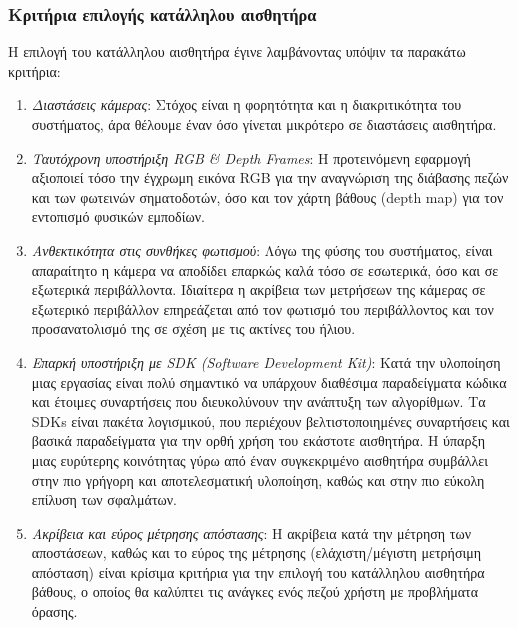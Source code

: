 \subsubsection{Κριτήρια επιλογής κατάλληλου αισθητήρα}
Η επιλογή του κατάλληλου αισθητήρα έγινε λαμβάνοντας υπόψιν τα παρακάτω κριτήρια:
\begin{enumerate}
    \item \emph{Διαστάσεις κάμερας}: Στόχος είναι η φορητότητα και η διακριτικότητα του συστήματος, άρα θέλουμε έναν όσο γίνεται μικρότερο σε διαστάσεις αισθητήρα.
    \item \emph{Ταυτόχρονη υποστήριξη RGB \& Depth Frames}: Η προτεινόμενη εφαρμογή αξιοποιεί τόσο την έγχρωμη εικόνα RGB για την αναγνώριση της διάβασης πεζών και των φωτεινών σηματοδοτών, όσο και τον χάρτη βάθους (depth map) για τον εντοπισμό φυσικών εμποδίων.
    \item \emph{Ανθεκτικότητα στις συνθήκες φωτισμού}: Λόγω της φύσης του συστήματος, είναι απαραίτητο η κάμερα να αποδίδει επαρκώς καλά τόσο σε εσωτερικά, όσο και σε εξωτερικά περιβάλλοντα. Ιδιαίτερα η ακρίβεια των μετρήσεων της κάμερας σε εξωτερικό περιβάλλον επηρεάζεται από τον φωτισμό του περιβάλλοντος και τον προσανατολισμό της σε σχέση με τις ακτίνες του ήλιου. 
    \item \emph{Επαρκή υποστήριξη με SDK (Software Development Kit)}: Κατά την υλοποίηση μιας εργασίας είναι πολύ σημαντικό να υπάρχουν διαθέσιμα παραδείγματα κώδικα και έτοιμες συναρτήσεις που διευκολύνουν την ανάπτυξη των αλγορίθμων. Τα SDKs είναι πακέτα λογισμικού, που περιέχουν βελτιστοποιημένες συναρτήσεις και βασικά παραδείγματα για την ορθή χρήση του εκάστοτε αισθητήρα. Η ύπαρξη μιας ευρύτερης κοινότητας γύρω από έναν συγκεκριμένο αισθητήρα συμβάλλει στην πιο γρήγορη και αποτελεσματική υλοποίηση, καθώς και στην πιο εύκολη επίλυση των σφαλμάτων.
    \item \emph{Ακρίβεια και εύρος μέτρησης απόστασης}: Η ακρίβεια κατά την μέτρηση των αποστάσεων, καθώς και το εύρος της μέτρησης (ελάχιστη/μέγιστη μετρήσιμη απόσταση) είναι κρίσιμα κριτήρια για την επιλογή του κατάλληλου αισθητήρα βάθους, ο οποίος θα καλύπτει τις ανάγκες ενός πεζού χρήστη με προβλήματα όρασης.
\end{enumerate}

